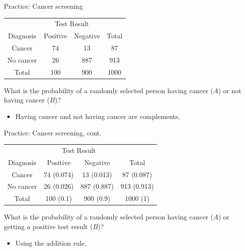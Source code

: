\documentclass[xcolor=table, aspectratio=169, bigger]{beamer}
\begin{document}
\begin{frame}{Practice: Cancer screening}
\begin{block}{}
{\centering
\begin{tabular}{c | c  c | c}
\multicolumn{1}{c}{} & \multicolumn{2}{c}{Test Result}\\
Diagnosis & Positive & Negative & Total \\
\hline
Cancer & 74 & 13 & 87\\
No cancer & 26 & 887 & 913\\
\hline
Total & 100 & 900 & 1000
\end{tabular}\par
}
\end{block}

\begin{exampleblock}{}
What is the probability of a randomly selected person having cancer ($A$) or not having cancer ($B$)?

\begin{itemize}
\pause
\item Having cancer and not having cancer are complements,\\
\smallskip{}
\end{itemize}
\end{exampleblock}
\end{frame}

\begin{frame}{Practice: Cancer screening, cont.}
\begin{block}{}
{\centering
\begin{tabular}{c | c  c | c}
\multicolumn{1}{c}{} & \multicolumn{2}{c}{Test Result}\\
Diagnosis & Positive & Negative & Total \\
\hline
Cancer & 74 (0.074) & 13 (0.013) & 87 (0.087)\\
No cancer & 26 (0.026) & 887 (0.887) & 913 (0.913)\\
\hline
Total & 100 (0.1) & 900 (0.9) & 1000 (1)
\end{tabular}\par
}
\end{block}

\begin{exampleblock}{}
What is the probability of a randomly selected person having cancer ($A$) or getting a positive test result ($B$)?

\begin{itemize}
\pause
\item Using the addition rule,\\
\smallskip{}
\pause{}
\end{itemize}
\end{exampleblock}
\end{frame}
\end{document}

